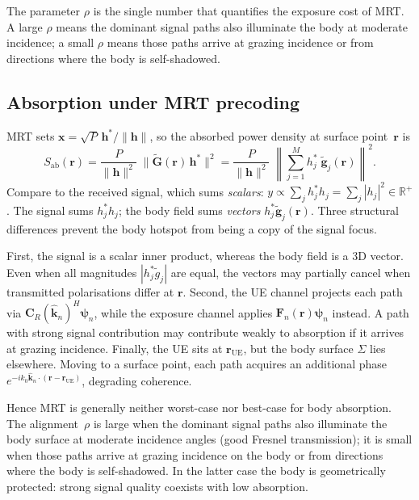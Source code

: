 \documentclass[11pt,a4paper]{article}
\theoremstyle{definition}      %
\newcommand{\rr}{\mathbf{r}}
\newcommand{\Sab}{S_{\mathrm{ab}}}
\begin{document}
The parameter $\rho$ is the single number that quantifies the
exposure cost of MRT.  A large $\rho$ means the dominant signal
paths also illuminate the body at moderate incidence; a small $\rho$
means those paths arrive at grazing incidence or from directions
where the body is self-shadowed.

\subsection{Absorption under MRT precoding}\label{sec:MRT-body}

MRT sets $\mathbf{x} = \sqrt{P}\,\mathbf{h}^*/\|\mathbf{h}\|$, so
the absorbed power density at surface point~$\rr$ is
\begin{equation}\label{eq:Sab-MRT}
  \Sab(\rr) = \frac{P}{\|\mathbf{h}\|^2}\;
  \bigl\|\tilde{\mathbf{G}}(\rr)\,\mathbf{h}^*\bigr\|^2
  = \frac{P}{\|\mathbf{h}\|^2}\;
  \left\|\sum_{j=1}^M h_j^*\;\tilde{\mathbf{g}}_j(\rr)\right\|^2.
\end{equation}
Compare to the received signal, which sums \emph{scalars}:
$y \propto \sum_j h_j^* h_j = \sum_j|h_j|^2 \in \mathbb{R}^+$.
The signal sums $h_j^* h_j$; the body field sums \emph{vectors}
$h_j^*\tilde{\mathbf{g}}_j(\rr)$.  Three structural differences
prevent the body hotspot from being a copy of the signal focus.

First, the signal is a scalar inner product, whereas the body field is a
3D vector.  Even when all magnitudes $|h_j^*\tilde{g}_j|$ are
equal, the vectors may partially cancel when transmitted
polarisations differ at $\mathbf{r}$.
Second, the UE channel projects each path via
$\mathbf{C}_R(\hat{\mathbf{k}}_n)^H\boldsymbol{\psi}_n$, while the
exposure channel applies
$\mathbf{F}_n(\mathbf{r})\boldsymbol{\psi}_n$ instead.  A path
with strong signal contribution may contribute weakly to absorption
if it arrives at grazing incidence.
Finally, the UE sits at $\mathbf{r}_\mathrm{UE}$, but the body surface
$\Sigma$ lies elsewhere.  Moving to a surface point, each path
acquires an additional phase
$e^{-ik_0\hat{\mathbf{k}}_n\cdot(\mathbf{r}-\mathbf{r}_\mathrm{UE})}$,
degrading coherence. 

Hence MRT is generally neither worst-case nor best-case for body
absorption.  The alignment~$\rho$ is large when the dominant signal
paths also illuminate the body surface at moderate incidence angles
(good Fresnel transmission); it is small when those paths arrive at
grazing incidence on the body or from directions where the body is
self-shadowed.  In the latter case the body is geometrically
protected: strong signal quality coexists with low absorption.
\end{document}
